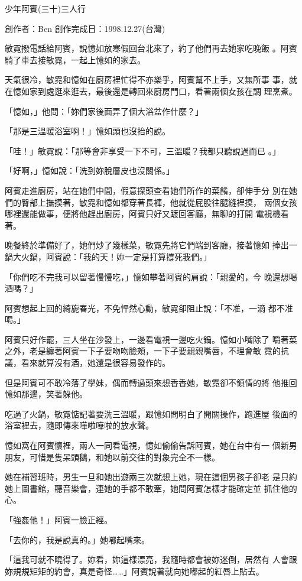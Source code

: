 



少年阿賓(三十)三人行

創作者：Ben
創作完成日：1998.12.27(台灣)


敏霓撥電話給阿賓，說憶如放寒假回台北來了，約了他們再去她家吃晚飯
。阿賓騎了車去接敏霓，一起上憶如的家去。

天氣很冷，敏霓和憶如在廚房裡忙得不亦樂乎，阿賓幫不上手，又無所事
事，就在憶如家到處逛來逛去，最後還是轉回來廚房門口，看著兩個女孩在調
理烹煮。

「憶如，」他問：「妳們家後面弄了個大浴盆作什麼？」

「那是三溫暖浴室啊！」憶如頭也沒抬的說。

「哇！」敏霓說：「那等會非享受一下不可，三溫暖？我都只聽說過而已
。」

「好啊，」憶如說：「洗到妳脫層皮也沒關係。」

阿賓走進廚房，站在她們中間，假意探頭查看她們所作的菜餚，卻伸手分
別在她們的臀部上撫摸著，敏霓和憶如都穿著長褲，他就從屁股往腿縫裡摸，
兩個女孩哪裡還能做事，便將他趕出廚房，阿賓只好又踱回客廳，無聊的打開
電視機看著。

晚餐終於準備好了，她們炒了幾樣菜，敏霓先將它們端到客廳，接著憶如
捧出一鍋大火鍋，阿賓說：「我的天！妳一定是打算撐死我們。」

「你們吃不完我可以留著慢慢吃，」憶如攀著阿賓的肩說：「親愛的，今
晚還想喝酒嗎？」

阿賓想起上回的綺旎春光，不免怦然心動，敏霓卻阻止說：「不准，一滴
都不准喝。」

阿賓只好作罷，三人坐在沙發上，一邊看電視一邊吃火鍋。憶如小嘴除了
嚼著菜之外，老是纏著阿賓一下子要吻吻臉頰，一下子要親親嘴唇，不理會敏
霓的抗議，看來就算沒有酒，她還是很容易發作的。

但是阿賓可不敢冷落了學妹，偶而轉過頭來想香香她，敏霓卻不領情的將
他推回憶如那邊，笑著躲他。

吃過了火鍋，敏霓惦記著要洗三溫暖，跟憶如問明白了開關操作，跑進屋
後面的浴室裡去，隨即傳來嘩啦嘩啦的放水聲。

憶如窩在阿賓懷裡，兩人一同看電視，憶如偷偷告訴阿賓，她在台中有一
個新男朋友，可惜是隻呆頭鵝，和她以前交往的對象完全不一樣。

她在補習班時，男生一旦和她出遊兩三次就想上她，現在這個男孩子卻老
是只約她上圖書館，聽音樂會，連她的手都不敢牽，她問阿賓怎樣才能確定並
抓住他的心。

「強姦他！」阿賓一臉正經。

「去你的，我是說真的。」她嘟起嘴來。

「這我可就不曉得了。妳看，妳這樣漂亮，我隨時都會被妳迷倒，居然有
人會跟妳規規矩矩的約會，真是奇怪……」阿賓說著就向她嘟起的紅唇上貼去。

